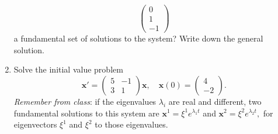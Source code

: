 \documentclass[10pt,a4paper]{letter}
\begin{document}
\begin{enumerate}
\[\begin{pmatrix}
0 \\
1 \\
-1 
\end{pmatrix}
\]
a fundamental set of solutions to the system? Write down the general solution.
\item Solve the initial value problem
\[ \mathbf{x}' = \begin{pmatrix}
5 & -1 \\
3 & 1 
\end{pmatrix}
\mathbf{x}, \quad \mathbf{x}(0) = \begin{pmatrix}
4 \\
-2
\end{pmatrix}. \]
\emph{Remember from class}: if the eigenvalues $\lambda_i$ are real and different, two fundamental solutions to this system are $\mathbf{x}^1 = \xi^1 e^{\lambda_1 t}$ and $\mathbf{x}^2 = \xi^2 e^{\lambda_2 t},$ for eigenvectors $\xi^1$ and $\xi^2$ to those eigenvalues.
\end{enumerate}
\end{document}
